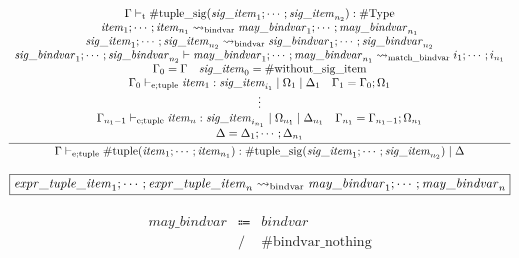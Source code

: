 \begin{gather*}
    \infer{\Gamma \vdash_{\mathrm{e}; \mathrm{tuple}} \mathrm{\#tuple}(\mathit{item}_1; \cdots; \mathit{item}_{n_1}): \mathrm{\#tuple\_sig}(\mathit{sig\_item}_1; \cdots; \mathit{sig\_item}_{n_2}) \mid \Delta}{
        \begin{array}{c}
            \Gamma \vdash_\mathrm{t} \mathrm{\#tuple\_sig}(\mathit{sig\_item}_1; \cdots; \mathit{sig\_item}_{n_2}): \mathrm{\#Type}
            \\
            \mathit{item}_1; \cdots; \mathit{item}_{n_1} \rightsquigarrow_\mathrm{bindvar} \mathit{may\_bindvar}_1; \cdots; \mathit{may\_bindvar}_{n_1}
            \\
            \mathit{sig\_item}_1; \cdots; \mathit{sig\_item}_{n_2} \rightsquigarrow_\mathrm{bindvar} \mathit{sig\_bindvar}_1; \cdots; \mathit{sig\_bindvar}_{n_2}
            \\
            \mathit{sig\_bindvar}_1; \cdots; \mathit{sig\_bindvar}_{n_2} \vdash \mathit{may\_bindvar}_1; \cdots; \mathit{may\_bindvar}_{n_1} \rightsquigarrow_\mathrm{match\_bindvar} i_1; \cdots; i_{n_1}
            \\
            \Gamma_0 = \Gamma
            \hspace{1em}
            \mathit{sig\_item}_0 = \mathrm{\#without\_sig\_item}
            \\
            \Gamma_0 \vdash_{\mathrm{e}; \mathrm{tuple}} \mathit{item}_1: \mathit{sig\_item}_{i_1} \mid \Omega_1 \mid \Delta_1
            \hspace{1em}
            \Gamma_1 = \Gamma_0; \Omega_1
            \\
            \vdots
            \\
            \Gamma_{n_1 - 1} \vdash_{\mathrm{e}; \mathrm{tuple}} \mathit{item}_n: \mathit{sig\_item}_{i_{n_1}} \mid \Omega_{n_1} \mid \Delta_{n_1}
            \hspace{1em}
            \Gamma_{n_1} = \Gamma_{n_1 - 1}; \Omega_{n_1}
            \\
            \Delta = \Delta_1; \cdots; \Delta_{n_1}
        \end{array}
    }
\end{gather*}

$\fbox{$\mathit{expr\_tuple\_item}_1; \cdots; \mathit{expr\_tuple\_item}_n \rightsquigarrow_\mathrm{bindvar} \mathit{may\_bindvar}_1; \cdots; \mathit{may\_bindvar}_n$}$

\begin{align*}
    \begin{array}{rcll}
        \mathit{may\_bindvar}
        &\Coloneq &\mathit{bindvar} \\
        &\mathrel{/} &\mathrm{\#bindvar\_nothing} \\
    \end{array}
\end{align*}

